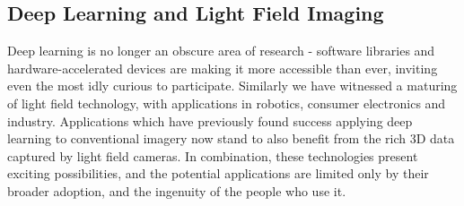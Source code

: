 \subsection{Deep Learning and Light Field Imaging}
Deep learning is no longer an obscure area of research - software libraries and hardware-accelerated devices are making it more accessible than ever, inviting even the most idly curious to participate. Similarly we have witnessed a maturing of light field technology, with applications in robotics, consumer electronics and industry. Applications which have previously found success applying deep learning to conventional imagery now stand to also benefit from the rich 3D data captured by light field cameras. In combination, these technologies present exciting possibilities, and the potential applications are limited only by their broader adoption, and the ingenuity of the people who use it.